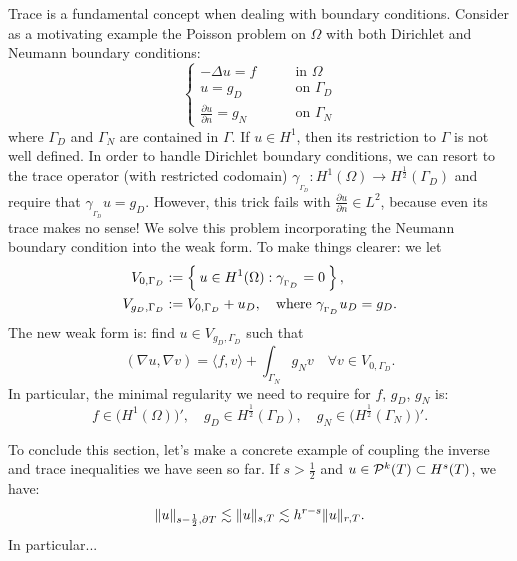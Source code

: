 Trace is a fundamental concept when dealing with boundary conditions. Consider as a motivating example the Poisson problem on $\Omega$ with both Dirichlet and Neumann boundary conditions:
\[
\begin{cases} 
-\Delta u = f \qquad &\text{in $\Omega$} \\
u =  g_D \qquad &\text{on $\Gamma_D$} \\
\frac{\partial u}{\partial n} =  g_N \qquad &\text{on $\Gamma_N$}
\end{cases}
\]
where $\Gamma_D$ and $\Gamma_N$ are contained in $\Gamma$. If $u \in H^1$, then its restriction to $\Gamma$ is not well defined. In order to handle Dirichlet boundary conditions, we can resort to the trace operator (with restricted codomain) $\gamma_{_{\Gamma_D}}: H^1(\Omega) \to H^{\frac{1}{2}}(\Gamma_D)$ and require that $\gamma_{_{\Gamma_D}} u = g_D$. However, this trick fails with $\frac{\partial u}{\partial n} \in L^2$, because even its trace makes no sense! We solve this problem incorporating the Neumann boundary condition into the weak form.
To make things clearer: we let
\begin{align}
V_{0,\Gamma_D} &:= \Set{u \in H^1(\Omega) : \gamma_{_{\Gamma_D}}=0}, \\
V_{g_D,\Gamma_D} &:= V_{0,\Gamma_D} + u_D, \quad \text{where } \gamma_{_{\Gamma_D}} u_D = g_D.
\end{align}
The new weak form is: find $u \in V_{g_D,\Gamma_D}$ such that
\[
(\nabla u, \nabla v) = \langle f, v \rangle + \int_{\Gamma_N} g_N v \quad \forall v \in V_{0,\Gamma_D}.
\]
In particular, the minimal regularity we need to require for $f$, $g_D$, $g_N$ is:
\[
f \in \bigl(H^1(\Omega)\bigr)', \quad g_D \in H^\frac{1}{2}(\Gamma_D), \quad g_N \in \bigl(H^\frac{1}{2}(\Gamma_N)\bigr)'.
\]

To conclude this section, let's make a concrete example of coupling the inverse and trace inequalities we have seen so far. If $s>\frac{1}{2}$ and $u \in \P^k(T) \subset H^s(T)$, we have:
\[
\norm{u}_{s-\frac{1}{2},\partial T} \lesssim \norm{u}_{s,T} \lesssim h^{r-s} \norm{u}_{r,T}.
\]
In particular...

